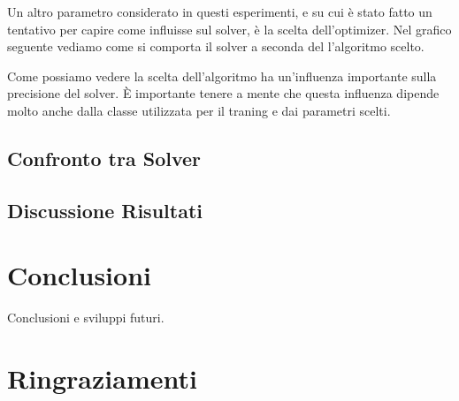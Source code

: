 \documentclass[a4paper,12pt]{report}
\begin{document}


Un altro parametro considerato in questi esperimenti, e su cui è stato fatto un tentativo per capire come influisse sul solver, è la scelta dell'optimizer. Nel grafico seguente vediamo come si comporta il solver a seconda del l'algoritmo scelto.


Come possiamo vedere la scelta dell'algoritmo ha un'influenza importante sulla precisione del solver. \`E importante tenere a mente che questa influenza dipende molto anche dalla classe utilizzata per il traning e dai parametri scelti.

\section{Confronto tra Solver}



\section{Discussione Risultati}




\chapter*{Conclusioni}
\label{Conclusioni}
Conclusioni e sviluppi futuri.


\chapter*{Ringraziamenti}
\label{Ringraziamenti}

%
%



\end{document}
